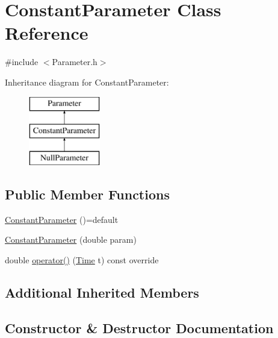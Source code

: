 \hypertarget{class_constant_parameter}{}\section{Constant\+Parameter Class Reference}
\label{class_constant_parameter}


{\ttfamily \#include $<$Parameter.\+h$>$}

Inheritance diagram for Constant\+Parameter\+:\begin{figure}[H]
\begin{center}
\leavevmode
\includegraphics[height=3.000000cm]{class_constant_parameter}
\end{center}
\end{figure}
\subsection*{Public Member Functions}
\begin{DoxyCompactItemize}
\item 
\hyperlink{class_constant_parameter_a914cfa1103bc8361f8f668316af04f27}{Constant\+Parameter} ()=default
\item 
\hyperlink{class_constant_parameter_ae3bc9ec65c93b6b88fe04dcb7010d897}{Constant\+Parameter} (double param)
\item 
double \hyperlink{class_constant_parameter_a23abb141692843e2ef68d43f610beb5e}{operator()} (\hyperlink{_name_def_8h_ac2d3e0ba793497bcca555c7c2cf64ff3}{Time} t) const override
\end{DoxyCompactItemize}
\subsection*{Additional Inherited Members}


\subsection{Constructor \& Destructor Documentation}
\hypertarget{class_constant_parameter_a914cfa1103bc8361f8f668316af04f27}{}\label{class_constant_parameter_a914cfa1103bc8361f8f668316af04f27} 
